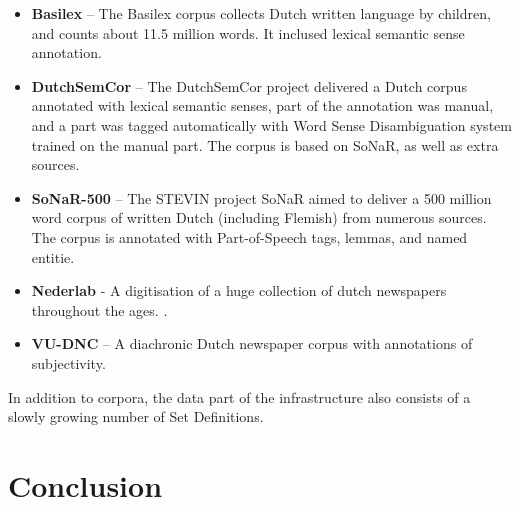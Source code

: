 \begin{itemize}
    \item \textbf{Basilex} -- The Basilex corpus collects Dutch written language by children,
        and counts about 11.5 million words. It inclused lexical semantic sense
        annotation.\cite{BASILEX}
    \item \textbf{DutchSemCor} -- The DutchSemCor project delivered a Dutch corpus annotated
        with lexical semantic senses, part of the annotation was manual, and a
        part was tagged automatically with Word Sense Disambiguation system trained on
        the manual part. The corpus is based on SoNaR, as well as extra
        sources. \cite{DUTCHSEMCOR}
    \item \textbf{SoNaR-500} --  The STEVIN project SoNaR aimed to deliver a 500 million
        word corpus of written Dutch (including Flemish) from numerous sources.
        The corpus is annotated with Part-of-Speech tags, lemmas, and named
        entitie. \cite{SONAR}
    \item \textbf{Nederlab} - A digitisation of a huge collection of dutch
        newspapers throughout the ages. \cite{NEDERLAB}.
    \item \textbf{VU-DNC} -- A diachronic Dutch newspaper corpus with annotations of
        subjectivity.\cite{VUDNC}
\end{itemize}

In addition to corpora, the data part of the infrastructure also consists of a
slowly growing number of Set Definitions. 

\section{Conclusion}






